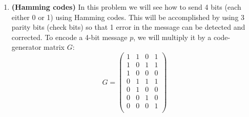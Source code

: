 \documentclass[11pt]{article}
\begin{document}
\begin{enumerate}
%
%



\item {\bf (Hamming codes)} In this problem we will see how to send 4 bits (each either 0 or 1) using Hamming codes. This will be accomplished by using 3 parity bits (check bits) so that 1 error in the message can be detected and corrected. To encode a 4-bit message $p$, we will multiply it by a code-generator matrix $G$:
\[ G = \left( \begin{array}{cccc} 1 & 1 & 0 & 1 \\
1 & 0 & 1 & 1 \\
1 & 0 & 0 & 0 \\
0 & 1 & 1 & 1 \\
0 & 1 & 0 & 0 \\
0 & 0 & 1 & 0 \\
0 & 0 & 0 & 1 \\
\end{array} \right)
\]   


\end{enumerate}
\end{document}
